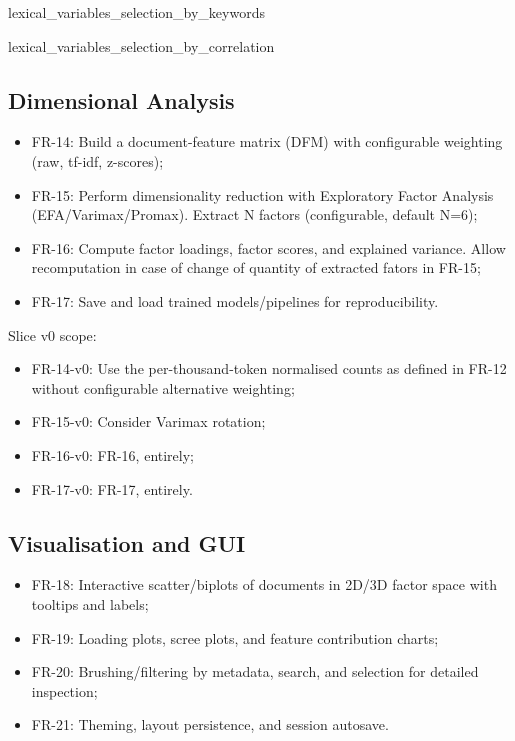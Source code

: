 {lexical_variables_selection_by_keywords}

{lexical_variables_selection_by_correlation}

\subsection{Dimensional Analysis}

\begin{itemize}
    \item FR-14: Build a document-feature matrix (DFM) with configurable weighting (raw, tf-idf, z-scores);
    \item FR-15: Perform dimensionality reduction with Exploratory Factor Analysis (EFA/Varimax/Promax). Extract N factors (configurable, default N=6);
    \item FR-16: Compute factor loadings, factor scores, and explained variance. Allow recomputation in case of change of quantity of extracted fators in FR-15;
    \item FR-17: Save and load trained models/pipelines for reproducibility.
\end{itemize}

Slice v0 scope:

\begin{itemize}
    \item FR-14-v0: Use the per-thousand-token normalised counts as defined in FR-12 without configurable alternative weighting;
    \item FR-15-v0: Consider Varimax rotation;
    \item FR-16-v0: FR-16, entirely;
    \item FR-17-v0: FR-17, entirely.
\end{itemize}

\subsection{Visualisation and GUI}

\begin{itemize}
    \item FR-18: Interactive scatter/biplots of documents in 2D/3D factor space with tooltips and labels;
    \item FR-19: Loading plots, scree plots, and feature contribution charts;
    \item FR-20: Brushing/filtering by metadata, search, and selection for detailed inspection;
    \item FR-21: Theming, layout persistence, and session autosave.
\end{itemize}

